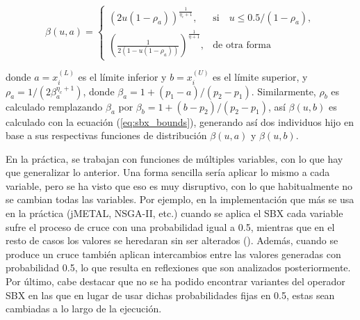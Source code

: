 \begin{equation} \label{eq:sbx_bounds}
    \beta(u, a)= 
\begin{cases}
     (2u(1-\rho_a))^{\frac{1}{\eta_c+1}},& \text{si} \quad u \leq 0.5/(1-\rho_a),\\
     	(\frac{1}{2(1-u(1-\rho_a))})^{\frac{1}{\eta+1}} ,& \text{de otra forma}
\end{cases}
\end{equation}

donde $a=x_i^{(L)}$ es el límite inferior y $b=x_i^{(U)}$ es el límite superior, y $\rho_a = 1/(2 \beta_a^{\eta_c+1})$, donde $\beta_a = 1 +(p_1 - a)/(p_2 - p_1)$.
%
Similarmente, $\rho_b$ es calculado remplazando $\beta_a$ por $\beta_b =  1 + (b - p_2)/(p_2 - p_1)$, así $\beta(u, b)$ es calculado con la ecuación (\ref{eq:sbx_bounds}), generando así dos individuos hijo en base a sus respectivas funciones de distribución $\beta(u,a)$ y $\beta(u,b)$.


En la práctica, se trabajan con funciones de múltiples variables, con lo que hay que generalizar lo anterior.
%
Una forma sencilla sería aplicar lo mismo a cada variable, pero se ha visto que eso es muy disruptivo, con lo que habitualmente
no se cambian todas las variables.
%
Por ejemplo, en la implementación que más se usa en la práctica (jMETAL, NSGA-II, etc.) cuando se aplica el SBX
cada variable sufre el proceso de cruce con una probabilidad igual a 0.5, mientras que en el resto de casos los valores 
se heredaran sin ser alterados (\cite{Joel:NSGAII,Joel:jMetal}).
%
Además, cuando se produce un cruce también aplican intercambios entre las valores generadas 
con probabilidad 0.5, lo que resulta en reflexiones que son analizados posteriormente.
%
Por último, cabe destacar que no se ha podido encontrar variantes del operador SBX en las que en lugar de usar dichas probabilidades
fijas en 0.5, estas sean cambiadas a lo largo de la ejecución.

